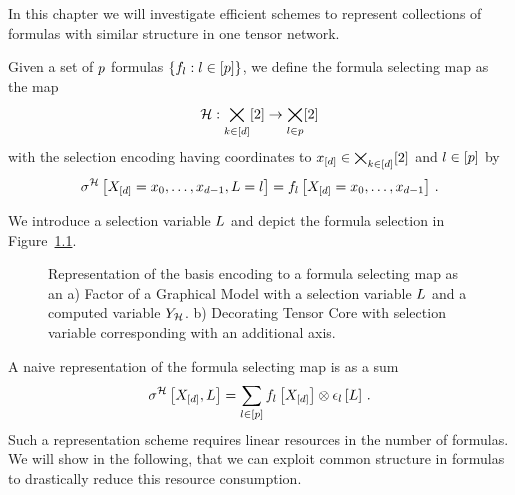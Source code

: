 \chapter{\chatextformulaSelection}\label{cha:formulaSelection}

In this chapter we will investigate efficient schemes to represent collections of formulas with similar structure in one tensor network.

\begin{definition}
	Given a set of $p$ formulas $\{f_{l} : l\in[p]\}$, we define the formula selecting map as the map
		\[  \mathcal{H} : \bigtimes_{k\in[d]}[2] \rightarrow \bigtimes_{l\in p} [2] \]
	with the selection encoding having coordinates to $x_{[d]}\in\bigtimes_{k\in[d]}[2]$ and $l\in[p]$ by
		\[ \sigma^{\mathcal{H}}\left[X_{[d]}={x_{0},\ldots,x_{d-1}},L=l\right] =  f_{l}\left[X_{[d]}={x_{0},\ldots,x_{d-1}}\right] \, . \]
\end{definition}

We introduce a selection variable $L$ and depict the formula selection in Figure~\ref{fig:formulaSelectionMap}.

\begin{figure}[h]
\begin{center}
	
\end{center}
\caption{Representation of the basis encoding to a formula selecting map as an
a) Factor of a Graphical Model with a selection variable $L$ and a computed variable $Y_{\mathcal{H}}$.
b) Decorating Tensor Core with selection variable corresponding with an additional axis.}
\label{fig:formulaSelectionMap}
\end{figure}


A naive representation of the formula selecting map is as a sum
\begin{align*}
	 \sigma^{\mathcal{H}}\left[X_{[d]},L\right]
	 = \sum_{l\in[p]} f_{l}\left[X_{[d]}\right]  \otimes \epsilon_{l}\left[L\right] \, .
\end{align*}
Such a representation scheme requires linear resources in the number of formulas.
We will show in the following, that we can exploit common structure in formulas to drastically reduce this resource consumption.




